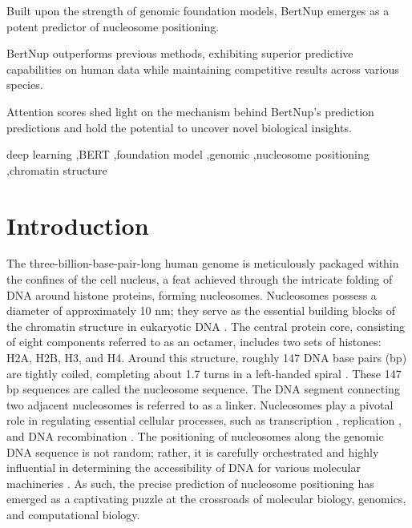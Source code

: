 \documentclass[a4paper,fleqn]{cas-dc}
\begin{document}

\begin{highlights}
\item Built upon the strength of genomic foundation models, BertNup emerges as a potent predictor of nucleosome positioning.
\item BertNup outperforms previous methods, exhibiting superior predictive capabilities on human data while maintaining competitive results across various species.
\item Attention scores shed light on the mechanism behind BertNup's prediction predictions and hold the potential to uncover novel biological insights.
\end{highlights}
\begin{keywords}
deep learning \sep BERT \sep foundation model \sep genomic \sep nucleosome positioning \sep chromatin structure 
\end{keywords}

\maketitle

\section{Introduction}

The three-billion-base-pair-long human genome is meticulously packaged within the confines of the cell nucleus, a feat achieved through the intricate folding of DNA around histone proteins, forming nucleosomes. Nucleosomes possess a diameter of approximately 10 nm; they serve as the essential building blocks of the chromatin structure in eukaryotic DNA \cite{Kornberg1999}. The central protein core, consisting of eight components referred to as an octamer, includes two sets of histones: H2A, H2B, H3, and H4. Around this structure, roughly 147 DNA base pairs (bp) are tightly coiled, completing about 1.7 turns in a left-handed spiral \cite{Luger1997, Richmond2003}. These 147 bp sequences are called the nucleosome sequence. The DNA segment connecting two adjacent nucleosomes is referred to as a linker. Nucleosomes play a pivotal role in regulating essential cellular processes, such as transcription \cite{Schones2008, Liu2015}, replication \cite{Eaton2010,Liu2017}, and DNA recombination \cite{Smagulova2011, Pulivarthy2016}. The positioning of nucleosomes along the genomic DNA sequence is not random; rather, it is carefully orchestrated and highly influential in determining the accessibility of DNA for various molecular machineries \cite{Kaplan2008}. As such, the precise prediction of nucleosome positioning has emerged as a captivating puzzle at the crossroads of molecular biology, genomics, and computational biology.
\end{document}
